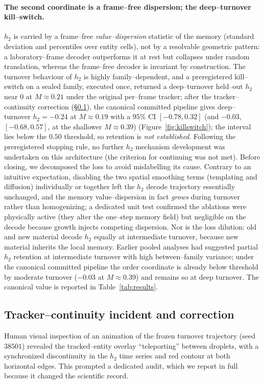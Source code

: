 \documentclass[11pt]{article}
\begin{document}
\paragraph{The second coordinate is a frame--free dispersion; the deep--turnover kill--switch.} $h_2$ is carried by
a frame--free \emph{value--dispersion} statistic of the memory (standard deviation and percentiles over entity
cells), not by a resolvable geometric pattern: a laboratory--frame decoder outperforms it at rest but collapses
under random translation, whereas the frame--free decoder is invariant by construction. The turnover behaviour of
$h_2$ is highly family--dependent, and a preregistered kill--switch on a sealed family, executed once, returned a deep--turnover held--out $h_2$ near $0$ at $M\approx0.21$ under the original per--frame tracker; after the tracker--continuity correction (\S\ref{sec:tracker}), the canonical committed pipeline gives deep--turnover $h_2=-0.24$ at $M\approx0.19$ with a $95\%$ CI $[-0.78,0.32]$ (and $-0.03$, $[-0.68,0.57]$, at the shallower $M\approx0.39$) (Figure~\ref{fig:killswitch}); the interval lies below the $0.50$ threshold, so retention is \emph{not established}. Following the preregistered stopping rule, no further $h_2$ mechanism development was undertaken on this architecture (the criterion for continuing was not met). Before closing, we decomposed the loss to avoid mislabelling its cause. Contrary to an intuitive expectation, disabling the two spatial smoothing terms (templating and diffusion) individually or together left the $h_2$ decode trajectory essentially unchanged, and the memory value--dispersion in fact \emph{grows} during turnover rather than homogenizing; a dedicated unit test confirmed the ablations were physically active (they alter the one--step memory field) but negligible on the decode because growth injects competing dispersion. Nor is the loss dilution: old and new material decode $h_2$ equally at intermediate turnover, because new material inherits the local memory. Earlier pooled analyses had suggested partial $h_2$ retention at intermediate turnover with high between--family variance; under the canonical committed pipeline the order coordinate is already below threshold by moderate turnover ($-0.03$ at $M\approx0.39$) and remains so at deep turnover. The canonical value is reported in Table~\ref{tab:results}.

\subsection{Tracker--continuity incident and correction}
\label{sec:tracker}
Human visual inspection of an animation of the frozen turnover trajectory (seed $38501$) revealed the
tracked--entity overlay ``teleporting'' between droplets, with a synchronized discontinuity in the $h_2$
time series and red contour at both horizontal edges. This prompted a dedicated audit, which we report in full
because it changed the scientific record.
\end{document}
